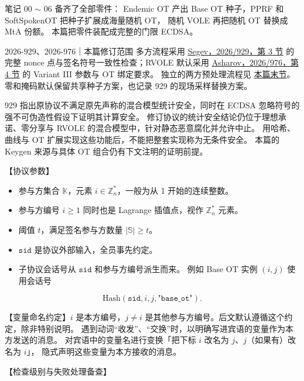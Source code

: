 
笔记 00 $\sim$ 06 备齐了全部零件：
Endemic OT 产出 Base OT 种子，PPRF 和 SoftSpokenOT 把种子扩展成海量随机 OT，
随机 VOLE 再把随机 OT 替换成 MtA 份额。
本篇把零件装配成完整的门限 ECDSA。

\begin{patchnote}{2026-929、2026-976｜本篇修订范围}
多方流程采用
\href{https://eprint.iacr.org/2026/929.pdf}{Segev，2026/929，第 3 节}
的完整 nonce 点与签名符号一致性检查；RVOLE 默认采用
\href{https://eprint.iacr.org/2026/976.pdf}{Asharov，2026/976，第 4 节}
的 Variant III 参数与 OT 绑定要求。
独立的两方预处理流程见 \hyperref[sec:orch:two-party-2026]{本篇末节}。
零和掩码默认保留共享种子方案，也记录 929 的现场采样替换方案。

929 指出原协议不满足原先声称的混合模型统计安全，同时在 ECDSA 忽略符号的强不可伪造性假设下证明其计算安全。
修订协议的统计安全结论仍位于理想承诺、零分享与 RVOLE 的混合模型中，针对静态恶意腐化并允许中止。
用哈希、曲线与 OT 扩展实现这些功能后，不能把整套实现称为无条件安全。
本篇的 Keygen 来源与具体 OT 组合仍有下文注明的证明前提。
\end{patchnote}

【协议参数】

\begin{itemize}
\item
  参与方集合 $\mathbb{K}$，元素 $i\in\mathbb{Z}_n^*$，一般为从 1 开始的连续整数。
\item
  参与方编号 $i \ge 1$ 同时也是 Lagrange 插值点，视作 $\mathbb{Z}_n^*$ 元素。
\item
  阈值 $t$，满足签名参与方数量 $\left| \mathbb{S} \right| \ge t$。
\item
  $\mathtt{sid}$ 是协议外部输入，全员事先约定。
\item
  子协议会话号从 $\mathtt{sid}$ 和参与方编号派生而来。
  例如 Base OT 实例 $(i,j)$ 使用会话号
\end{itemize}
\begin{equation}
\label{eq:orch:subsid-example}\tag{subsid-example}
\mathrm{Hash}(\mathtt{sid}, i, j, \texttt{"base\_ot"}). 
\end{equation}

【变量命名约定】$i$ 是本方编号，$j\ne i$ 是其他参与方编号。后文默认遵循这个约定，除非特别说明。
遇到动词“收发”、“交换”时，以明确写进宾语的变量作为本方发送的消息。
对宾语中的变量名进行变换「把下标 $i$ 改名为 $j$、$j$（如果有）改名为 $i$」，
隐式声明这些变量为本方接收的消息。

【检查级别与失败处理备查】
\label{sec:orch:failure-levels}

